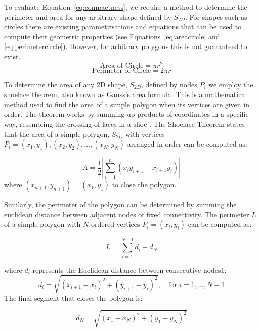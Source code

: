 \documentclass{article}
\begin{document}
To evaluate Equation~\eqref{eq:compactness}, we require a method to determine the perimeter and area for any arbitrary shape defined by $S_{2D}$. For shapes such as circles there are existing parametrisations and equations that can be used to compute their geometric properties (see Equations~\eqref{eq:areacircle} and \eqref{eq:perimetercircle}). However, for arbitrary polygons this is not guaranteed to exist.
\begin{equation}
    \text{Area of Circle}= \pi r^2 
    \label{eq:areacircle}
\end{equation}
\begin{equation}
    \text{Perimeter of Circle}= 2\pi r
    \label{eq:perimetercircle}
\end{equation}

To determine the area of any 2D shape, $S_{2D}$, defined by nodes $P_i$ we employ the shoelace theorem, also known as Gauss's area formula. This is a mathematical method used to find the area of a simple polygon when its vertices are given in order. The theorem works by summing up products of coordinates in a specific way, resembling the crossing of laces in a shoe \citep{Braden1986}.
The Shoelace Theorem states that the area of a simple polygon, $S_{2D}$ with vertices $P_i =(x_1, y_1), (x_2, y_2), \dots, (x_N, y_N)$ arranged in order can be computed as:

\begin{equation}
A = \frac{1}{2} \left| \sum_{i=1}^{n} (x_i y_{i+1} - x_{i+1} y_i) \right|
\label{area_equaton}
\end{equation}
where \((x_{n+1}, y_{n+1}) = (x_1, y_1)\) to close the polygon.

Similarly, the perimeter of the polygon can be determined by summing the euclidean distance between adjacent nodes of fixed connectivity. The perimeter \( L \) of a simple polygon with \( N \) ordered vertices \( P_i = (x_i, y_i) \) can be computed as:


\begin{equation}
    L = \sum_{i=1}^{N-1} d_i + d_N
    \label{perimiter_equaton}
\end{equation}

where \( d_i \) represents the Euclidean distance between consecutive nodes1:
\[
d_i = \sqrt{(x_{i+1} - x_i)^2 + (y_{i+1} - y_i)^2}, \quad \text{for } i = 1, \dots, N-1
\]
The final segment that closes the polygon is:

\[
d_N = \sqrt{(x_1 - x_N)^2 + (y_1 - y_N)^2}
\]
\end{document}
